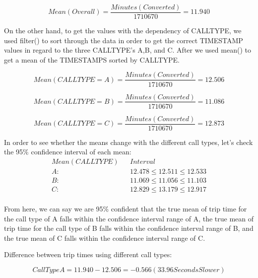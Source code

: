 \documentclass[11pt]{article}
\begin{document}
\begin{equation}
Mean (Overall) = \frac{Minutes (Converted)}{1710670} = 11.940
\end{equation}

\par
On the other hand, to get the values with the dependency of CALLTYPE, we used filter() to sort through the data in order to get the correct TIMESTAMP values in regard to the three CALLTYPE’s A,B, and C. After we used mean() to get a mean of the TIMESTAMPS sorted by CALLTYPE. 

\begin{equation}
Mean (CALLTYPE = A) = \frac{Minutes (Converted)}{1710670} = 12.506
\end{equation}

\begin{equation}
Mean (CALLTYPE = B) = \frac{Minutes (Converted)}{1710670} = 11.086
\end{equation}

\begin{equation}
Mean (CALLTYPE = C) = \frac{Minutes (Converted)}{1710670} = 12.873
\end{equation}

\par
In order to see whether the means change with the different call types, let's check the 95\% confidence interval of each mean:
\begin{equation*}
	\begin{aligned}
		Mean (CALL TYPE) &&Interval\\
A:  && 12.478 \le 12.511 \le 12.533\\
B: && 11.069 \le 11.056 \le 11.103\\
C:  && 12.829 \le 13.179 \le 12.917\\
	\end{aligned}
\end{equation*}
\par
From here, we can say we are 95\% confident that the true mean of trip time for the call type of A falls within the confidence interval range of A, the true mean of trip time for the call type of B falls within the confidence interval range of B, and the true mean of C falls within the confidence interval range of C.

\par
Difference between trip times using different call types:

\begin{equation}
Call Type A = 11.940 - 12.506 = -0.566 (33.96 Seconds Slower)
\end{equation}
\end{document}
